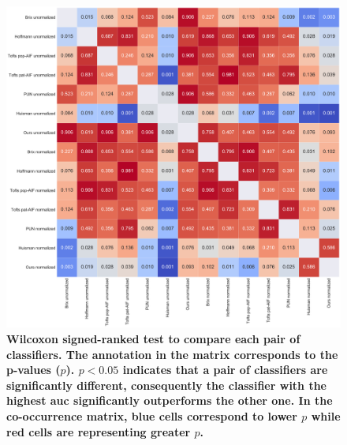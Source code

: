 \begin{figure}
  \centering
  \includegraphics[width=1.\linewidth]{03_experiments/figures/wilcoxon.pdf}
  \caption{\textbf{Wilcoxon signed-ranked test to compare each pair of
    classifiers. The annotation in the matrix corresponds to the
    p-values ($p$). $p < 0.05$ indicates that a pair of classifiers
    are significantly different, consequently the classifier with the
    highest \acs*{auc} significantly outperforms the other
    one. In the co-occurrence matrix, {\color{blue}blue} cells
    correspond to lower $p$ while {\color{red} red} cells are
    representing greater $p$.}}
  \label{fig:wilcoxon}
\end{figure}

